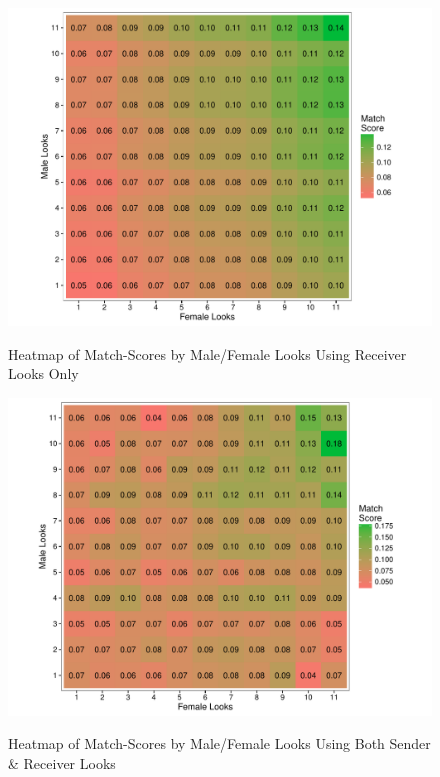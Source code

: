 \begin{figure}[!htb]
  \centering
  \caption{Heatmap of Match-Scores by Male/Female Looks Using Receiver Looks Only}
  \includegraphics[scale=.7]{q3_score_heatmap.pdf}
  \label{fig:q3_score_heatmap}
\end{figure}

\begin{figure}[!htb]
  \centering
  \caption{Heatmap of Match-Scores by Male/Female Looks Using Both Sender \& Receiver Looks}
  \includegraphics[scale=.7]{q4_heat.pdf}
  \label{fig:q4_heat}
\end{figure}




